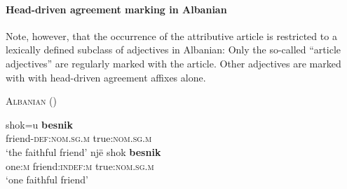 \paragraph{Head-driven agreement marking in Albanian}
Note, however, that the occurrence of the attributive article is restricted to a lexically defined subclass of adjectives in Albanian: Only the so-called “article adjectives” are regularly marked with the article. Other adjectives are marked with with head-driven agreement affixes alone.
\begin{exe}
\ex \textsc{Albanian} (\citealt[167]{himmelmann1997})
\begin{xlist}
\ex
\gll	shok=u					\textbf{besnik}\\
	friend-\textsc{def:nom.sg.m} 	true:\textsc{nom.sg.m}\\
\glt	‘the faithful friend’
\ex
\gll 	nj\"e			shok					\textbf{besnik}\\
	one:\textsc{m}	friend:\textsc{indef:m} 	true:\textsc{nom.sg.m}\\
\glt	‘one faithful friend’
\end{xlist}
\end{exe}

